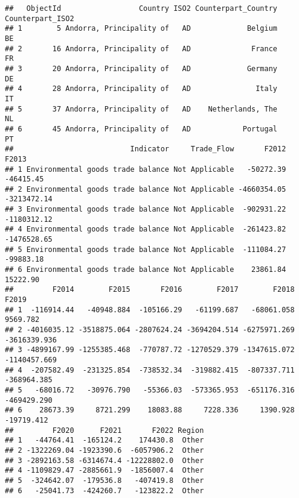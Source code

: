 \documentclass[
]{article}
\begin{document}
\begin{verbatim}
##   ObjectId                  Country ISO2 Counterpart_Country Counterpart_ISO2
## 1        5 Andorra, Principality of   AD             Belgium               BE
## 2       16 Andorra, Principality of   AD              France               FR
## 3       20 Andorra, Principality of   AD             Germany               DE
## 4       28 Andorra, Principality of   AD               Italy               IT
## 5       37 Andorra, Principality of   AD    Netherlands, The               NL
## 6       45 Andorra, Principality of   AD            Portugal               PT
##                           Indicator     Trade_Flow       F2012       F2013
## 1 Environmental goods trade balance Not Applicable   -50272.39   -46415.45
## 2 Environmental goods trade balance Not Applicable -4660354.05 -3213472.14
## 3 Environmental goods trade balance Not Applicable  -902931.22 -1180312.12
## 4 Environmental goods trade balance Not Applicable  -261423.82 -1476528.65
## 5 Environmental goods trade balance Not Applicable  -111084.27   -99883.18
## 6 Environmental goods trade balance Not Applicable    23861.84    15222.90
##         F2014        F2015       F2016        F2017        F2018        F2019
## 1  -116914.44   -40948.884  -105166.29   -61199.687   -68061.058     9569.782
## 2 -4016035.12 -3518875.064 -2807624.24 -3694204.514 -6275971.269 -3616339.936
## 3 -4899167.99 -1255385.468  -770787.72 -1270529.379 -1347615.072 -1140457.669
## 4  -207582.49  -231325.854  -738532.34  -319882.415  -807337.711  -368964.385
## 5   -68016.72   -30976.790   -55366.03  -573365.953  -651176.316  -469429.290
## 6    28673.39     8721.299    18083.88     7228.336     1390.928   -19719.412
##         F2020      F2021       F2022 Region
## 1   -44764.41  -165124.2    174430.8  Other
## 2 -1322269.04 -1923390.6  -6057906.2  Other
## 3 -2892163.58 -6314674.4 -12228802.0  Other
## 4 -1109829.47 -2885661.9  -1856007.4  Other
## 5  -324642.07  -179536.8   -407419.8  Other
## 6   -25041.73  -424260.7   -123822.2  Other
\end{verbatim}
\end{document}

